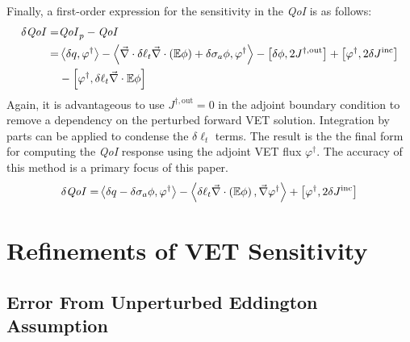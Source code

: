 \documentclass[12pt]{report}
\newcommand{\bra}{\left\langle}
\newcommand{\ket}{\right\rangle}
\newcommand{\sbra}{\left[}
\newcommand{\sket}{\right]}
\renewcommand{\div}{\vec{\nabla} \cdot}
\newcommand{\grad}{\vec{\nabla}}
\newcommand{\vefadj}{\varphi^\dag}
\newcommand{\Edd}{\mathbb{E}}
\newcommand{\siga}{\sigma_a}
\newcommand{\isigt}{\ell_t}
\newcommand{\scalSource}{q}
\newcommand{\qoi}{{\it QoI}\xspace}
\begin{document}
Finally, a first-order expression for the sensitivity in the \qoi is as follows:
\begin{equation}
\label{QoIVETAdjlong}
\begin{split}
\delta \qoi =& \qoi_p - \qoi \\ 
=& \bra \delta \scalSource , \vefadj \ket - \bra \div \delta \isigt \div \left( \Edd \phi \right)  + \delta \siga \phi, \vefadj \ket 
- \sbra \delta \phi, 2J^{\dag,\text{out}} \sket + \sbra \vefadj, 2 \delta J^{\text{inc}} \sket \\
& - \sbra \vefadj, \delta \isigt \div \Edd \phi \sket 
\end{split}
\end{equation}
Again, it is advantageous to use $J^{\dag,\text{out}}=0$ in the adjoint boundary condition to remove a dependency on the 
perturbed forward VET solution. Integration by parts can be applied to condense the $\delta \isigt$ terms. The result is the the final form for computing the \qoi response using the adjoint VET flux $\vefadj$. The accuracy of this method is a primary focus of this paper.
\begin{equation}
\label{VETsens}
\begin{split}
\delta \qoi =&  \bra \delta \scalSource - \delta \siga \phi, \vefadj \ket  - \bra \delta \isigt \div \left( \Edd \phi \right) , \grad \vefadj \ket
 + \sbra \vefadj, 2 \delta J^{\text{inc}} \sket \\
\end{split}
\end{equation}



\section{Refinements of VET Sensitivity}

\subsection{Error From Unperturbed Eddington Assumption}
\end{document}
